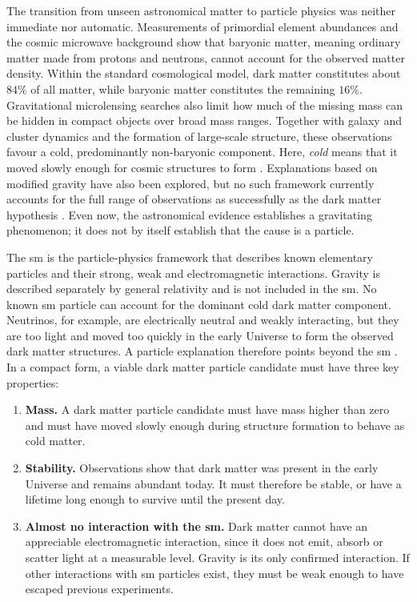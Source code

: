 The transition from unseen astronomical matter to particle physics was neither
immediate nor automatic. Measurements of primordial element abundances and the
cosmic microwave background show that baryonic matter, meaning ordinary matter
made from protons and neutrons, cannot account for the observed matter density.
Within the standard cosmological model, dark matter constitutes about \(84\%\)
of all matter, while baryonic matter constitutes the remaining \(16\%\).
Gravitational microlensing searches also limit how much of the missing mass can
be hidden in compact objects over broad mass ranges. Together with galaxy and
cluster dynamics and the formation of large-scale structure, these observations
favour a cold, predominantly non-baryonic component. Here, \emph{cold} means
that it moved slowly enough for cosmic structures to form
\cite{bertone2016-history-dark-matter,cirelli2026-darkmatter}. Explanations based
on modified gravity have also been explored, but no such framework currently
accounts for the full range of observations as successfully as the dark matter
hypothesis \cite{cirelli2026-darkmatter}. Even now, the astronomical evidence
establishes a gravitating phenomenon; it does not by itself establish that the
cause is a particle.

The \gls{sm} is the particle-physics framework that describes known elementary
particles and their strong, weak and electromagnetic interactions. Gravity is
described separately by general relativity and is not included in the \gls{sm}.
No known \gls{sm} particle can account for the dominant cold dark matter
component. Neutrinos, for example, are electrically neutral and weakly
interacting, but they are too light and moved too quickly in the early Universe
to form the observed dark matter structures. A particle explanation therefore
points beyond the \gls{sm} \cite{cirelli2026-darkmatter}. In a compact form, a
viable dark matter particle candidate must have three key properties:

\begin{enumerate}
    \item \textbf{Mass.} A dark matter particle candidate must have mass higher
    than zero and must have moved slowly enough during structure formation to
    behave as cold matter.
    \item \textbf{Stability.} Observations show that dark matter was present in
    the early Universe and remains abundant today. It must therefore be stable,
    or have a lifetime long enough to survive until the present day.
    \item \textbf{Almost no interaction with the \gls{sm}.} Dark matter cannot
    have an appreciable electromagnetic interaction, since it does not emit,
    absorb or scatter light at a measurable level. Gravity is its only confirmed
    interaction. If other interactions with \gls{sm} particles exist, they must
    be weak enough to have escaped previous experiments.
\end{enumerate}

